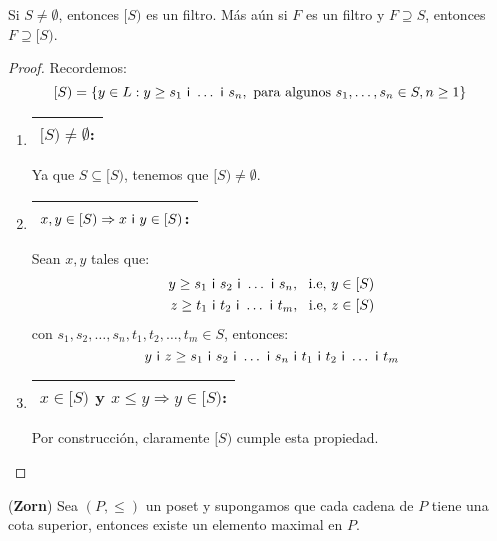   \begin{lemma}
    \PN Si $S \neq \emptyset$, entonces $[S)$ es un filtro. Más aún si $F$ es un filtro y $F \supseteq S$, entonces $F
    \supseteq \lbrack S)$.
  \end{lemma}
  \begin{proof}
    \PN Recordemos:
    \[
      [S) = \{y \in L: y \geq s_{1} \ \mathsf{i} \ \dotsc \ \mathsf{i} \ s_{n}, \text{ para algunos } s_{1}, \dotsc, s_{n} \in S,
      n \geq 1\}
    \]

    \begin{enumerate}
      \item \begin{tabular}{|c|} \hline $[S) \neq \emptyset$: \\\hline \end{tabular} Ya que $S \subseteq \lbrack S)$,
        tenemos que $[S) \neq \emptyset$.
      \item \begin{tabular}{|c|} \hline $x, y \in [S) \Rightarrow x \ \mathsf{i} \ y \in [S)$: \\\hline \end{tabular} Sean $x,
        y$ tales que:
        \begin{eqnarray*}
          y \geq s_{1} \ \IN \ s_{2} \ \IN \ \dotsc \ \IN \ s_{n}, \ \text{ i.e, } y \in [S) \\
          z \geq t_{1} \ \IN \ t_{2} \ \IN \ \dotsc \ \IN \ t_{m}, \ \text{ i.e, } z \in [S)
        \end{eqnarray*}
        \PN con $s_{1}, s_{2}, \dotsc, s_{n}, t_{1}, t_{2}, \dotsc, t_{m} \in S$, entonces:
        \[
          y \ \IN \ z \geq s_{1} \ \IN \ s_{2} \ \IN \ \dotsc \ \IN \  s_{n} \ \IN \ t_{1} \ \IN \ t_{2} \ \IN \ \dotsc
          \ \IN \ t_{m}
        \]
      \item \begin{tabular}{|c|} \hline $x \in [S)$ y $x \leq y \Rightarrow y \in [S)$: \\\hline \end{tabular} Por
        construcción, claramente $[S)$ cumple esta propiedad.
    \end{enumerate}
  \end{proof}

  \begin{lemma} \label{lemma_23}
    \PN (\textbf{Zorn}) Sea $(P, \leq)$ un poset y supongamos que cada cadena de $P$ tiene una cota superior, entonces
    existe un elemento maximal en $P$.
  \end{lemma}

